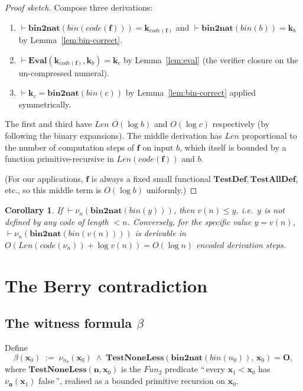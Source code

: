 \documentclass[11pt]{article}
\theoremstyle{plain}
\newtheorem{corollary}[theorem]{Corollary}
\theoremstyle{definition}
\theoremstyle{remark}
\newcommand{\code}[1]{\mathit{code}(#1)}
\newcommand{\Fun}{\mathit{Fun}}
\newcommand{\Len}{\mathit{Len}}
\newcommand{\Eval}{\mathbf{Eval}}
\newcommand{\bnt}{\mathbf{bin2nat}}
\newcommand{\bin}{\mathit{bin}}
\begin{document}
\begin{proof}[Proof sketch]
Compose three derivations:
\begin{enumerate}
\item $\vdash \bnt(\bin(\code{\mathbf{f}})) = \mathbf{k}_{\code{\mathbf{f}}}$ and $\vdash \bnt(\bin(b)) = \mathbf{k}_b$ by Lemma~\ref{lem:bin-correct}.
\item $\vdash \Eval(\mathbf{k}_{\code{\mathbf{f}}}, \mathbf{k}_b) = \mathbf{k}_c$ by Lemma~\ref{lem:eval} (the verifier closure on the un-compressed numeral).
\item $\vdash \mathbf{k}_c = \bnt(\bin(c))$ by Lemma~\ref{lem:bin-correct} applied symmetrically.
\end{enumerate}
The first and third have $\Len$ $O(\log b)$ and $O(\log c)$
respectively (by following the binary expansions).  The middle
derivation has $\Len$ proportional to the number of computation steps
of $\mathbf{f}$ on input $b$, which itself is bounded by a function
primitive-recursive in $\Len(\code{\mathbf{f}})$ and $b$.

(For our applications, $\mathbf{f}$ is always a fixed small functional
$\mathbf{TestDef}, \mathbf{TestAllDef}$, etc., so this middle term is
$O(\log b)$ uniformly.)
\end{proof}

\begin{corollary}\label{cor:nu-sound}
If $\vdash \nu_n(\bnt(\bin(y)))$, then $v(n) \leq y$, i.e.\ $y$ is not
defined by any code of length $< n$.  Conversely, for the specific
value $y = v(n)$, $\vdash \nu_n(\bnt(\bin(v(n))))$ is derivable in
$O(\Len(\code{\nu_n}) + \log v(n)) = O(\log n)$ encoded
derivation steps.
\end{corollary}

\section{The Berry contradiction}

\subsection{The witness formula $\beta$}

Define
$$
\beta(\mathbf{x}_0) \;:=\; \nu_{n_0}(\mathbf{x}_0) \;\wedge\; \mathbf{TestNoneLess}(\bnt(\bin(n_0)),\, \mathbf{x}_0) = \mathbf{O},
$$
where $\mathbf{TestNoneLess}(\mathbf{n}, \mathbf{x}_0)$ is the
$\Fun_2$ predicate ``\,every $\mathbf{x}_1 < \mathbf{x}_0$ has
$\nu_{\mathbf{n}}(\mathbf{x}_1)$ false\,'', realised as a bounded
primitive recursion on $\mathbf{x}_0$.
\end{document}
